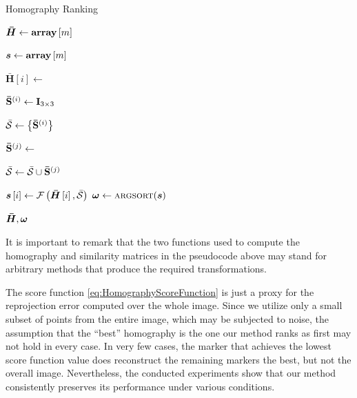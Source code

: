 \def\hmatrices{\boldsymbol{\bar{H}}}
\def\scoref{\mathcal{F}}

\begin{algorithm}[t]
    \caption{Homography Ranking}
    \label{alg:HomographyRanking}
    \begin{algorithmic}[1]
        \State $\hmatrices \gets \arraydef \left[ m \right]$

        \State $\boldsymbol{s} \gets {\text{\textbf{array}}} \left[ m \right]$


        \State $\hmatrices \left[ i \right] \gets$

        \State ${\mathbf{\bar{S}}}^{\left( {i} \right)} \gets \mathbf{I}_{3 \times 3}$

        \State $\mathcal{\bar{S}} \gets \left\{ {{\mathbf{\bar{S}}}^{\left( {i} \right)}} \right\}$


        \State ${\mathbf{\bar{S}}}^{\left( {j} \right)} \gets$ \Call{similarity}{$\hmatrices \left[ i \right] \cdot \suprbrackets{\mtx{W}}{j}$, $\mtx{T }$}

        \State$\mathcal{\bar{S}} \gets \mathcal{\bar{S}} \cup {\mathbf{\bar{S}}}^{\left( {j} \right)}$
        \EndFor

        \State $\scores \left[ i \right] \gets \func{\scoref}{\hmatrices \left[ i \right], \mset{\bar{S}}}$
        \EndFor
        \State $\sortres \gets \Call{argsort}{\scores}$

        \State \Return $\hmatrices, \sortres$
    \end{algorithmic}
\end{algorithm}

It is important to remark that the two functions used to compute the homography and similarity matrices in the pseudocode above may stand for arbitrary methods that produce the required transformations.

The score function \ref{eq:HomographyScoreFunction} is just a proxy for the reprojection error computed over the whole image. Since we utilize only a small subset of points from the entire image, which may be subjected to noise, the assumption that the ``best'' homography is the one our method ranks as first may not hold in every case. In very few cases, the marker that achieves the lowest score function value does reconstruct the remaining markers the best, but not the overall image. Nevertheless, the conducted experiments show that our method consistently preserves its performance under various conditions.

